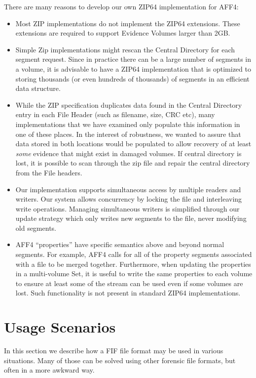 \documentclass[10pt, conference]{IEEEtran}
\begin{document}
There are many reasons to develop our own ZIP64 implementation for
AFF4:

\begin{itemize}
\item Most ZIP implementations do not implement the ZIP64
  extensions. These extensions are required to support Evidence
  Volumes larger than 2GB.
\item Simple Zip implementations might rescan the
Central Directory for each segment request. Since in practice there
can be a large number of segments in a volume, it is advisable to have
a ZIP64 implementation that is optimized to storing thousands (or even
hundreds of thousands) of segments in an efficient data structure. 
\item While the ZIP specification duplicates data found in the Central
  Directory entry in each File Header (such as filename, size, CRC
  etc), many implementations that we have examined only populate this
  information in one of these places. In the interest of robustness,
  we wanted to assure that data stored in both locations would be
  populated to allow recovery of at least \emph{some} evidence that
  might exist in damaged volumes. If central directory is lost, it is
  possible to scan through the zip file and repair the central
  directory from the File headers.

\item Our implementation supports simultaneous access by multiple
  readers and writers. Our system allows concurrency by locking the
  file and interleaving write operations. Managing simultaneous
  writers is simplified through our update strategy which only writes
  new segments to the file, never modifying old segments. 
\item AFF4 ``properties'' have specific semantics above and beyond
  normal segments. For example, AFF4 calls for all of the property
  segments associated with a file to be merged together. Furthermore,
  when updating the properties in a multi-volume Set, it is useful to
  write the same properties to each volume to ensure at least some of
the stream can be used even if some volumes are lost. Such
functionality is not present in standard ZIP64 implementations.
\end{itemize}

\section{Usage Scenarios}
In this section we describe how a FIF file format may be used in
various situations. Many of those can be solved using other forensic
file formats, but often in a more awkward way.
\end{document}
